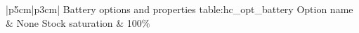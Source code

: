 \begin{customLongTable}{ |p{5cm}|p{3cm}| }
{Battery options and properties} {table:hc_opt_battery}
{Option name & None}
\endhead
\hline
Stock saturation & 100\% \\ \hline
\end{customLongTable}
